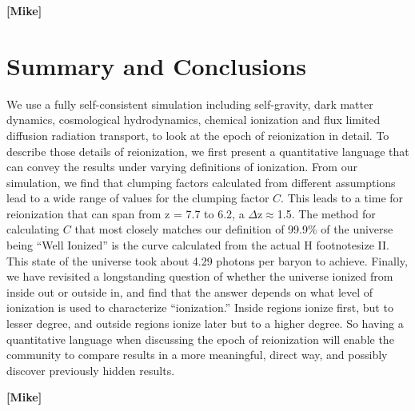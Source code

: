 \documentclass[letterpaper,10pt]{article}
\renewcommand{\(}{\left(}
\renewcommand{\)}{\right)}
\begin{document}
{\bf [Mike]}


\section{Summary and Conclusions}
\label{Conclusions}

We use a fully self-consistent simulation including self-gravity, dark
matter dynamics, cosmological hydrodynamics, chemical ionization and
flux limited diffusion radiation transport, to look at the epoch of
reionization in detail.  To describe those details of reionization, we
first present a quantitative language that can convey the results
under varying definitions of ionization.  From our simulation, we find
that clumping factors calculated from different assumptions lead to a
wide range of values for the clumping factor $C$. This leads to a time
for reionization that can span from z = 7.7 to 6.2, a
$\Delta$z$\approx$1.5.  The method for calculating $C$ that most
closely matches our definition of 99.9\% of the universe being ``Well 
Ionized'' is the curve calculated from the actual H {footnotesize II}.
This state of the universe took about 4.29 photons per baryon to
achieve.  Finally, we have revisited a longstanding question of
whether the universe ionized from inside out or outside in, and find
that the answer depends on what level of ionization is used to
characterize ``ionization.''  Inside regions ionize first, but to
lesser degree, and outside regions ionize later but to a higher
degree.  So having a quantitative language when discussing the epoch
of reionization will enable the community to compare results in a more
meaningful, direct way, and possibly discover previously hidden
results.



{\bf [Mike]}

{\footnotesize
}

\end{document}
